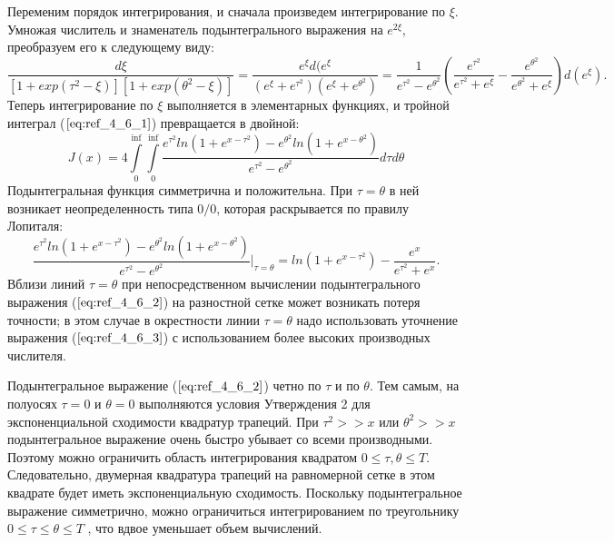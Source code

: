 Переменим порядок интегрирования, и сначала произведем интегрирование по
$\xi$. Умножая числитель и знаменатель подынтегрального выражения на $e^{2\xi}$,
преобразуем его к следующему виду:
\begin{equation}
\frac{d\xi}{[1+exp(\tau^2-\xi)][1+exp(\theta^2-\xi)]} = \frac{e^{\xi}d(e^{\xi}}{(e^{\xi} + e^{\tau^2})(e^{\xi} + e^{\theta^2})} = \frac{1}{e^{\tau^2}-e^{\theta^2}} (\frac{e^{\tau^2}}{e^{\tau^2} + e^{\xi}}-\frac{e^{\theta^2}}{e^{\theta^2} + e^{\xi}}) d(e^{\xi}).
\end{equation}
Теперь интегрирование по $\xi$ выполняется в элементарных функциях, и
тройной интеграл ($\ref{eq:ref_4_6_1}$) превращается в двойной:
\begin{equation}
J(x) = 4\int\limits_0^{\inf} \int\limits_0^{\inf} \frac{e^{\tau^2} ln (1 + e^{x-\tau^2}) - e^{\theta^2} ln (1 + e^{x-\theta^2})}{e^{\tau^2} - e^{\theta^2}} d\tau d\theta
\label{eq:ref_4_6_2}
\end{equation}
Подынтегральная функция симметрична и положительна. При $\tau = \theta$ в ней
возникает неопределенность типа $0/0$, которая раскрывается по правилу
Лопиталя:
\begin{equation}
\frac{e^{\tau^2} ln (1 + e^{x-\tau^2}) - e^{\theta^2} ln (1 + e^{x-\theta^2})}{e^{\tau^2} - e^{\theta^2}} \Bigg|_{\tau = \theta} =ln(1+e^{x-\tau^2}) - \frac{e^x}{e^{\tau^2} + e^x}.
\label{eq_4_6_3}
\end{equation}
Вблизи линий $\tau = \theta$ при непосредственном вычислении подынтегрального
выражения ($\ref{eq:ref_4_6_2}$) на разностной сетке может возникать потеря точности; в этом
случае в окрестности линии $\tau = \theta$ надо использовать уточнение выражения ($\ref{eq:ref_4_6_3}$)
с использованием более высоких производных числителя.

Подынтегральное выражение ($\ref{eq:ref_4_6_2}$) четно по $\tau$ и по $\theta$. Тем самым, на
полуосях $\tau = 0$ и $\theta = 0$ выполняются условия Утверждения 2 для
экспоненциальной сходимости квадратур трапеций. При $\tau^2 >> x$ или $\theta^2 >> x$
подынтегральное выражение очень быстро убывает со всеми производными.
Поэтому можно ограничить область интегрирования квадратом $0 \leqslant \tau ,\theta \leqslant T$.
Следовательно, двумерная квадратура трапеций на равномерной сетке в этом
квадрате будет иметь экспоненциальную сходимость. Поскольку
подынтегральное выражение симметрично, можно ограничиться
интегрированием по треугольнику $0 \leqslant \tau \leqslant \theta \leqslant T$ , что вдвое уменьшает объем вычислений.

